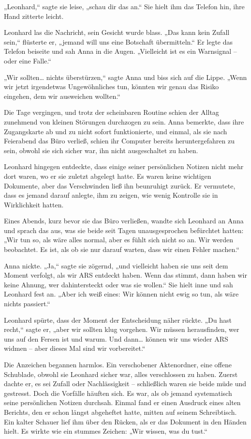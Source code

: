 \documentclass[
]{article}
\begin{document}
„Leonhard,`` sagte sie leise, „schau dir das an.`` Sie hielt ihm das
Telefon hin, ihre Hand zitterte leicht.

Leonhard las die Nachricht, sein Gesicht wurde blass. „Das kann kein
Zufall sein,`` flüsterte er, „jemand will uns eine Botschaft
übermitteln.`` Er legte das Telefon beiseite und sah Anna in die Augen.
„Vielleicht ist es ein Warnsignal -- oder eine Falle.``

„Wir sollten\ldots{} nichts überstürzen,`` sagte Anna und biss sich auf
die Lippe. „Wenn wir jetzt irgendetwas Ungewöhnliches tun, könnten wir
genau das Risiko eingehen, dem wir ausweichen wollten.``

Die Tage vergingen, und trotz der scheinbaren Routine schien der Alltag
zunehmend von kleinen Störungen durchzogen zu sein. Anna bemerkte, dass
ihre Zugangskarte ab und zu nicht sofort funktionierte, und einmal, als
sie nach Feierabend das Büro verließ, schien ihr Computer bereits
heruntergefahren zu sein, obwohl sie sich sicher war, ihn nicht
ausgeschaltet zu haben.

Leonhard hingegen entdeckte, dass einige seiner persönlichen Notizen
nicht mehr dort waren, wo er sie zuletzt abgelegt hatte. Es waren keine
wichtigen Dokumente, aber das Verschwinden ließ ihn beunruhigt zurück.
Er vermutete, dass es jemand darauf anlegte, ihm zu zeigen, wie wenig
Kontrolle sie in Wirklichkeit hatten.

Eines Abends, kurz bevor sie das Büro verließen, wandte sich Leonhard an
Anna und sprach das aus, was sie beide seit Tagen unausgesprochen
befürchtet hatten: „Wir tun so, als wäre alles normal, aber es fühlt
sich nicht so an. Wir werden beobachtet. Es ist, als ob sie nur darauf
warten, dass wir einen Fehler machen.``

Anna nickte. „Ja,`` sagte sie zögernd, „und vielleicht haben sie uns
seit dem Moment verfolgt, als wir ARS entdeckt haben. Wenn das stimmt,
dann haben wir keine Ahnung, wer dahintersteckt oder was sie wollen.``
Sie hielt inne und sah Leonhard fest an. „Aber ich weiß eines: Wir
können nicht ewig so tun, als wäre nichts passiert.``

Leonhard spürte, dass der Moment der Entscheidung näher rückte. „Du hast
recht,`` sagte er, „aber wir sollten klug vorgehen. Wir müssen
herausfinden, wer uns auf den Fersen ist und warum. Und dann\ldots{}
können wir uns wieder ARS widmen -- aber dieses Mal sind wir
vorbereitet.``

Die Anzeichen begannen harmlos. Ein verschobener Aktenordner, eine
offene Schublade, obwohl sie Leonhard sicher war, alles verschlossen zu
haben. Zuerst dachte er, es sei Zufall oder Nachlässigkeit --
schließlich waren sie beide müde und gestresst. Doch die Vorfälle
häuften sich. Es war, als ob jemand systematisch seine persönlichen
Notizen durchsah. Einmal fand er einen Ausdruck eines alten Berichts,
den er schon längst abgeheftet hatte, mitten auf seinem Schreibtisch.
Ein kalter Schauer lief ihm über den Rücken, als er das Dokument in den
Händen hielt. Es wirkte wie ein stummes Zeichen: „Wir wissen, was du
tust.``
\end{document}
